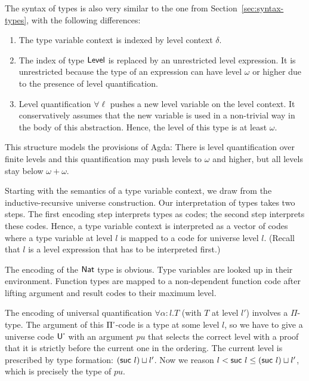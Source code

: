 \documentclass[manuscript,screen,review,anonymous]{acmart}
\begin{document}
{\begin{minipage}{0.45\linewidth}
  \IRTEnv
\end{minipage}
\begin{minipage}{0.45\linewidth}
  \IRTEnvNi
\end{minipage}

The syntax of types is also very similar to the one from
Section~\ref{sec:syntax-types}, with the following differences:
\begin{enumerate}
\item The type variable context is indexed by level context $\delta$.
\item The index of type $\ALevel$ is replaced by an unrestricted level
  expression. It is unrestricted because the type of an expression can
  have level $\omega$ or higher due to the presence of level
  quantification.
\item Level quantification $\forall\ell$ pushes a new level variable on
  the level context. It conservatively assumes that the new variable
  is used in a non-trivial way in the body of this abstraction. Hence,
  the level of this type is at least $\omega$.
\end{enumerate}
This structure models the provisions of Agda: There is level
quantification over finite levels and this quantification may push
levels to $\omega$ and higher, but all levels stay below $\omega+\omega$.

\IRType

Starting with the semantics of a type variable context, we draw from
the inductive-recursive universe construction. Our interpretation of
types takes two steps. The first encoding step interprets types as
codes; the second step interprets these codes. Hence, a type variable
context is interpreted as a vector of codes where a type variable at
level $l$ is mapped to a code for universe level $l$. (Recall that $l$
is a level expression that has to be interpreted first.)

\IRFTSEAsFunction

The encoding of the $\ANat$ type is obvious.  Type variables are
looked up in their environment. Function types are mapped to a
non-dependent function code after lifting argument and result codes to
their maximum level.

The encoding of universal quantification $\forall
\alpha: l. T$ (with $T$ at level $l'$) involves a $\Pi$-type. The
argument of this $\APi$-code is a type at some level 
$l$, so we have to give a universe code $\AUp$ with an argument $pu$ that selects the correct
level with a proof that it is strictly before the current one in the
ordering. The current level is prescribed by type formation: $(\Asuc~
l) \sqcup l'$. Now we reason $l < \Asuc~l \le (\Asuc~ l) \sqcup l'$,
which is precisely the type of $pu$.

}
\end{document}
